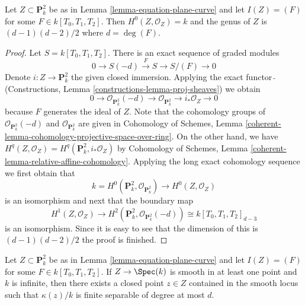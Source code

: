 \begin{lemma}
\label{lemma-genus-plane-curve}
Let $Z \subset \mathbf{P}^2_k$ be as in Lemma \ref{lemma-equation-plane-curve}
and let $I(Z) = (F)$ for some $F \in k[T_0, T_1, T_2]$.
Then $H^0(Z, \mathcal{O}_Z) = k$ and the genus of $Z$ is
$(d - 1)(d - 2)/2$ where $d = \deg(F)$.
\end{lemma}

\begin{proof}
Let $S = k[T_0, T_1, T_2]$.
There is an exact sequence of graded modules
$$
0 \to S(-d) \xrightarrow{F} S \to S/(F) \to 0
$$
Denote $i : Z \to \mathbf{P}^2_k$ the given closed immersion.
Applying the exact functor $\widetilde{\ }$
(Constructions, Lemma \ref{constructions-lemma-proj-sheaves})
we obtain
$$
0 \to \mathcal{O}_{\mathbf{P}^2_k}(-d) \to
\mathcal{O}_{\mathbf{P}^2_k} \to i_*\mathcal{O}_Z \to 0
$$
because $F$ generates the ideal of $Z$.
Note that the cohomology groups of $\mathcal{O}_{\mathbf{P}^2_k}(-d)$ and
$\mathcal{O}_{\mathbf{P}^2_k}$ are given in
Cohomology of Schemes, Lemma
\ref{coherent-lemma-cohomology-projective-space-over-ring}.
On the other hand, we have
$H^q(Z, \mathcal{O}_Z) = H^q(\mathbf{P}^2_k, i_*\mathcal{O}_Z)$ by
Cohomology of Schemes, Lemma \ref{coherent-lemma-relative-affine-cohomology}.
Applying the long exact cohomology sequence
we first obtain that
$$
k = H^0(\mathbf{P}^2_k, \mathcal{O}_{\mathbf{P}^2_k}) \longrightarrow
H^0(Z, \mathcal{O}_Z)
$$
is an isomorphism and next that the boundary map
$$
H^1(Z, \mathcal{O}_Z) \longrightarrow
H^2(\mathbf{P}^2_k, \mathcal{O}_{\mathbf{P}^2_k}(-d)) \cong
k[T_0, T_1, T_2]_{d - 3}
$$
is an isomorphism. Since it is easy to see that the dimension of this
is $(d - 1)(d - 2)/2$ the proof is finished.
\end{proof}

\begin{lemma}
\label{lemma-smooth-plane-curve-point-over-separable}
Let $Z \subset \mathbf{P}^2_k$ be as in Lemma \ref{lemma-equation-plane-curve}
and let $I(Z) = (F)$ for some $F \in k[T_0, T_1, T_2]$.
If $Z \to \Spec(k)$ is smooth in at least one point and $k$ is infinite, then
there exists a closed point $z \in Z$ contained in the smooth
locus such that $\kappa(z)/k$ is finite separable of degree
at most $d$.
\end{lemma}

